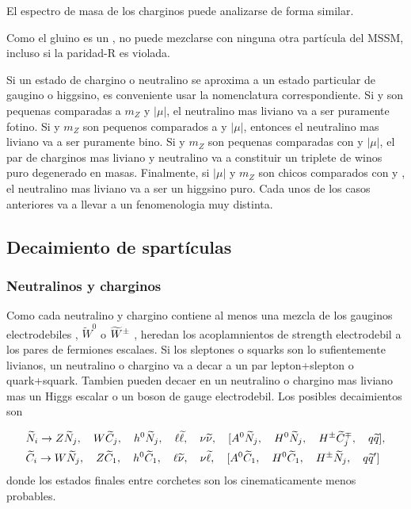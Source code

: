 El espectro de masa de los charginos puede analizarse de forma similar.

Como el gluino es un , no puede mezclarse con ninguna
otra partícula del MSSM, incluso si la paridad-R es violada.



Si un estado de chargino o neutralino se aproxima a un estado
particular de gaugino o higgsino, es conveniente usar la nomenclatura
correspondiente. Si  y  son pequenas comparadas a $m_Z$ y $|\mu|$,
el neutralino mas liviano va a ser puramente fotino. Si  y $m_Z$ son pequenos comparados
a  y $|\mu|$, entonces el neutralino mas liviano va a ser puramente bino.
Si  y $m_Z$ son pequenas comparadas con  y $|\mu|$, el par de charginos mas liviano y
neutralino va a constituir un triplete de winos puro degenerado en masas.
Finalmente, si $|\mu|$ y $m_Z$ son chicos comparados con  y ,
el neutralino mas liviano va a ser un higgsino puro. Cada unos de los
casos anteriores va a llevar a un fenomenologia muy distinta.


\subsection{Decaimiento de spartículas}

\subsubsection{Neutralinos y charginos}

Como cada neutralino y chargino contiene al menos una mezcla
de los gauginos electrodebiles {\bino}, $\tilde W^0$ o $\widetilde{W}^{\pm}$
, heredan los acoplamnientos de strength electrodebil a los pares
de fermiones escalaes. Si los sleptones o squarks son lo sufientemente
livianos, un neutralino o chargino va a decar a un par lepton+slepton
o quark+squark. Tambien pueden decaer en un neutralino o chargino
mas liviano mas un Higgs escalar o un boson de gauge electrodebil.
Los posibles decaimientos son

\begin{align*}
  &\widetilde{N}_i \rightarrow Z \widetilde{N}_j, \quad W \widetilde{C}_j, \quad h^0 \widetilde{N}_j, \quad \ell \widetilde{\ell}, \quad \nu \widetilde{\nu}, \quad
  [A^0 \widetilde{N}_j, \quad H^0 \widetilde{N}_j, \quad H^{\pm} \widetilde{C}_j^{\mp}, \quad q \widetilde{q}], \\
  &\widetilde{C}_i \rightarrow W \widetilde{N}_j, \quad Z \widetilde{C}_1, \quad h^0 \widetilde{C}_1, \quad \ell \widetilde{\nu}, \quad \nu \widetilde{\ell}, \quad
  [A^0 \widetilde{C}_1, \quad H^0 \widetilde{C}_1, \quad H^{\pm} \widetilde{N}_j, \quad q \widetilde{q}']
\end{align*}
%
donde los estados finales entre corchetes son los cinematicamente menos probables.

